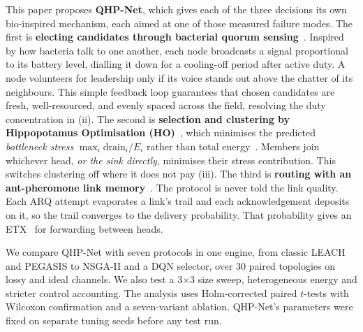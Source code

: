 This paper proposes \textbf{QHP-Net}, which gives each of the three decisions its own bio-inspired mechanism, each aimed at one of those measured failure modes. The first is \textbf{electing candidates through bacterial quorum sensing}~\cite{miller2001quorum}. Inspired by how bacteria talk to one another, each node broadcasts a signal proportional to its battery level, dialling it down for a cooling-off period after active duty. A node volunteers for leadership only if its voice stands out above the chatter of its neighbours. This simple feedback loop guarantees that chosen candidates are fresh, well-resourced, and evenly spaced across the field, resolving the duty concentration in (ii). The second is \textbf{selection and clustering by Hippopotamus Optimisation (HO)}~\cite{amiri2024hippo}, which minimises the predicted \emph{bottleneck stress} $\max_i \text{drain}_i/E_i$ rather than total energy~\cite{chang2004maxlife}. Members join whichever head, \emph{or the sink directly}, minimises their stress contribution. This switches clustering off where it does not pay (iii). The third is \textbf{routing with an ant-pheromone link memory}~\cite{dorigo2006aco}. The protocol is never told the link quality. Each ARQ attempt evaporates a link's trail and each acknowledgement deposits on it, so the trail converges to the delivery probability. That probability gives an ETX~\cite{decouto2003etx} for forwarding between heads.

We compare QHP-Net with seven protocols in one engine, from classic LEACH and PEGASIS to NSGA-II and a DQN selector, over 30 paired topologies on lossy and ideal channels. We also test a 3$\times$3 size sweep, heterogeneous energy and stricter control accounting. The analysis uses Holm-corrected paired $t$-tests with Wilcoxon confirmation and a seven-variant ablation. QHP-Net's parameters were fixed on separate tuning seeds before any test run.

